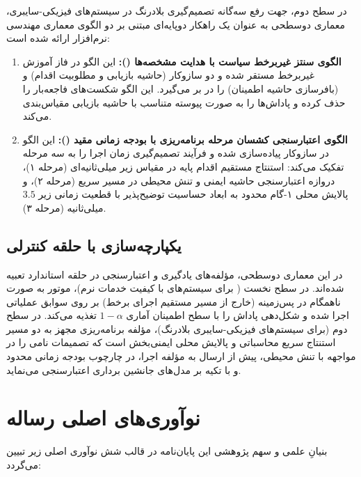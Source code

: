 \documentclass[oneside,openany,phd]{TMU-Thesis}
\begin{document}
در سطح دوم، جهت رفع سه‌گانه تصمیم‌گیری بلادرنگ در سیستم‌های فیزیکی-سایبری، معماری دوسطحی \rsdrlplus به عنوان یک راهکار دوپایه‌ای مبتنی بر دو الگوی معماری مهندسی نرم‌افزار ارائه شده است:
\begin{enumerate}
    \item \textbf{الگوی سنتز غیربرخط سیاست با هدایت مشخصه‌ها (\sgos):} این الگو در فاز آموزش غیربرخط مستقر شده و دو سازوکار \mursdrl (حاشیه بازیابی و مطلوبیت اقدام) و \cmrsdrl (بافرسازی حاشیه اطمینان) را در بر می‌گیرد. این الگو شکست‌های فاجعه‌بار را حذف کرده و پاداش‌ها را به صورت پیوسته متناسب با حاشیه بازیابی مقیاس‌بندی می‌کند.
    \item \textbf{الگوی اعتبارسنجی کشسان مرحله برنامه‌ریزی با بودجه زمانی مقید (\caepv):} این الگو در سازوکار \pgalr پیاده‌سازی شده و فرآیند تصمیم‌گیری زمان اجرا را به سه مرحله تفکیک می‌کند: استنتاج مستقیم اقدام پایه در مقیاس زیر میلی‌ثانیه‌ای (مرحله ۱)، دروازه اعتبارسنجی حاشیه ایمنی و تنش محیطی در مسیر سریع (مرحله ۲)، و پالایش محلی ۱-گام محدود به ابعاد حساسیت توضیح‌پذیر  با قطعیت زمانی زیر $3.5$ میلی‌ثانیه (مرحله ۳).
\end{enumerate}

\subsection{یکپارچه‌سازی با حلقه کنترلی }

در این معماری دوسطحی، مؤلفه‌های یادگیری و اعتبارسنجی در حلقه استاندارد  تعبیه شده‌اند. در سطح نخست ( برای سیستم‌های با کیفیت خدمات نرم)، موتور  به صورت ناهمگام در پس‌زمینه (خارج از مسیر مستقیم اجرای برخط) بر روی سوابق عملیاتی اجرا شده و شکل‌دهی پاداش را با سطح اطمینان آماری $1-\alpha$ تغذیه می‌کند. در سطح دوم (\rsdrlplus برای سیستم‌های فیزیکی-سایبری بلادرنگ)، مؤلفه برنامه‌ریزی مجهز به دو مسیر استنتاج سریع محاسباتی و پالایش محلی ایمنی‌بخش است که تصمیمات نامی را در مواجهه با تنش محیطی، پیش از ارسال به مؤلفه اجرا، در چارچوب بودجه زمانی محدود و با تکیه بر مدل‌های جانشین برداری اعتبارسنجی می‌نماید.

\section{نوآوری‌های اصلی رساله}

بنیانِ علمی و سهم پژوهشی این پایان‌نامه در قالب شش نوآوری اصلی زیر تبیین می‌گردد:
\end{document}
